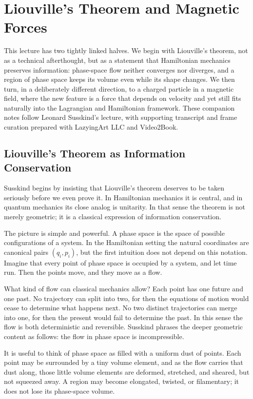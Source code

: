 \chapter{Liouville's Theorem and Magnetic Forces}

This lecture has two tightly linked halves. We begin with Liouville's theorem, not as a technical afterthought, but as a statement that Hamiltonian mechanics preserves information: phase-space flow neither converges nor diverges, and a region of phase space keeps its volume even while its shape changes. We then turn, in a deliberately different direction, to a charged particle in a magnetic field, where the new feature is a force that depends on velocity and yet still fits naturally into the Lagrangian and Hamiltonian framework. These companion notes follow Leonard Susskind's lecture, with supporting transcript and frame curation prepared with LazyingArt LLC and Video2Book.

\section{Liouville's Theorem as Information Conservation}

Susskind begins by insisting that Liouville's theorem deserves to be taken seriously before we even prove it. In Hamiltonian mechanics it is central, and in quantum mechanics its close analog is unitarity. In that sense the theorem is not merely geometric; it is a classical expression of information conservation.

The picture is simple and powerful. A phase space is the space of possible configurations of a system. In the Hamiltonian setting the natural coordinates are canonical pairs \((q_i,p_i)\), but the first intuition does not depend on this notation. Imagine that every point of phase space is occupied by a system, and let time run. Then the points move, and they move as a flow.

What kind of flow can classical mechanics allow? Each point has one future and one past. No trajectory can split into two, for then the equations of motion would cease to determine what happens next. No two distinct trajectories can merge into one, for then the present would fail to determine the past. In this sense the flow is both deterministic and reversible. Susskind phrases the deeper geometric content as follows: the flow in phase space is incompressible.

It is useful to think of phase space as filled with a uniform dust of points. Each point may be surrounded by a tiny volume element, and as the flow carries that dust along, those little volume elements are deformed, stretched, and sheared, but not squeezed away. A region may become elongated, twisted, or filamentary; it does not lose its phase-space volume.


